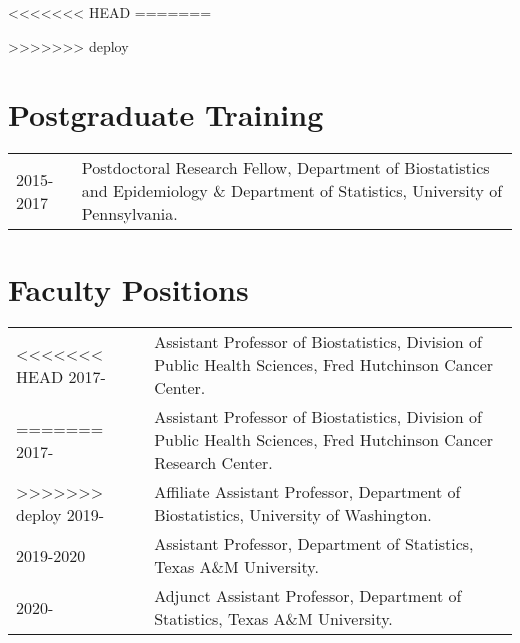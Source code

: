\documentclass[10pt]{article}
\begin{document}
<<<<<<< HEAD
=======

>>>>>>> deploy
\section{Postgraduate Training} 
\begin{table}[H]
\hskip0.9cm\begin{tabular}{p{1.6cm}p{12cm}}
2015-2017 & Postdoctoral Research Fellow, {Department of Biostatistics and Epidemiology} \& {Department of Statistics}, University of Pennsylvania. %
\end{tabular}
\end{table}


\section{Faculty Positions} 
\begin{table}[H]
\hskip0.9cm\begin{tabular}{p{1.6cm}p{12cm}}
<<<<<<< HEAD
2017- & Assistant Professor of Biostatistics, Division of Public Health Sciences, Fred Hutchinson Cancer Center. \\
=======
2017- & Assistant Professor of Biostatistics, Division of Public Health Sciences, Fred Hutchinson Cancer Research Center. \\
>>>>>>> deploy
2019- & Affiliate Assistant Professor, Department of Biostatistics, University of Washington.  \\
2019-2020  & Assistant Professor, Department of Statistics, Texas A\&M University.\\
2020- & Adjunct Assistant Professor, Department of Statistics, Texas A\&M University.
\end{tabular}
\end{table}
\end{document}
